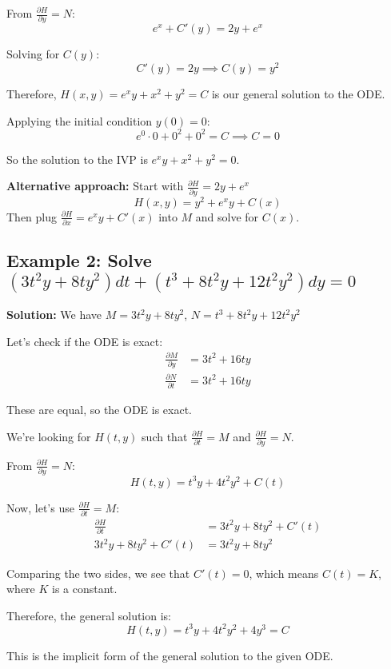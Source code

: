 \documentclass{article}
\begin{document}
From $\frac{\partial H}{\partial y} = N$:
\[
    e^x + C'(y) = 2y + e^x
\]

Solving for $C(y)$:
\[
    C'(y) = 2y \implies C(y) = y^2
\]

Therefore, $H(x,y) = e^x y + x^2 + y^2 = C$ is our general solution to the ODE.

Applying the initial condition $y(0) = 0$:
\[
    e^0 \cdot 0 + 0^2 + 0^2 = C \implies C = 0
\]

So the solution to the IVP is $e^x y + x^2 + y^2 = 0$.

\textbf{Alternative approach:} Start with $\frac{\partial H}{\partial y} = 2y + e^x$
\[
    H(x,y) = y^2 + e^x y + C(x)
\]
Then plug $\frac{\partial H}{\partial x} = e^x y + C'(x)$ into $M$ and solve for $C(x)$.

\subsection*{Example 2: Solve $(3t^2 y + 8ty^2) dt + (t^3 + 8t^2 y + 12t^2 y^2) dy = 0$}

\textbf{Solution:} We have $M = 3t^2 y + 8ty^2$, $N = t^3 + 8t^2 y + 12t^2 y^2$

Let's check if the ODE is exact:
\begin{align*}
    \frac{\partial M}{\partial y} &= 3t^2 + 16ty \\
    \frac{\partial N}{\partial t} &= 3t^2 + 16ty
\end{align*}

These are equal, so the ODE is exact.

We're looking for $H(t,y)$ such that $\frac{\partial H}{\partial t} = M$ and $\frac{\partial H}{\partial y} = N$.

From $\frac{\partial H}{\partial y} = N$:
\[
    H(t,y) = t^3 y + 4t^2 y^2 + C(t)
\]

Now, let's use $\frac{\partial H}{\partial t} = M$:
\begin{align*}
    \frac{\partial H}{\partial t} &= 3t^2y + 8t y^2 + C'(t) \\
    3t^2y + 8t y^2 + C'(t) &= 3t^2 y + 8ty^2
\end{align*}

Comparing the two sides, we see that $C'(t) = 0$, which means $C(t) = K$, where $K$ is a constant.

Therefore, the general solution is:
\[
    H(t,y) = t^3 y + 4t^2 y^2+4y^3 = C
\]

This is the implicit form of the general solution to the given ODE.
\end{document}
